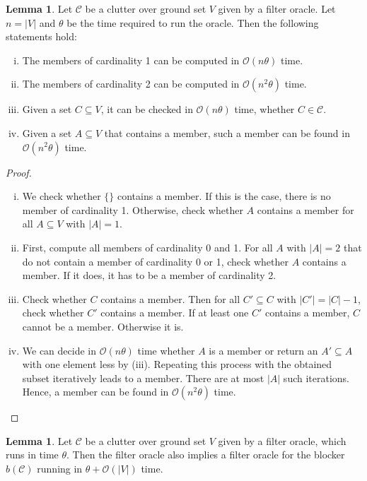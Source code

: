 \documentclass[a4paper, 12pt]{scrbook}
\theoremstyle{definition}
\newtheorem{lemma}[theorem]{Lemma}
\begin{document}
   \begin{lemma}\label{computations}
       Let $\mathcal{C}$ be a clutter over ground set $V$ given by a filter oracle.
       Let $n=|V|$ and $\theta$ be the time required to run the oracle.
       Then the following statements hold:
       \begin{enumerate}[(i)]
           \item The members of cardinality 1 can be computed in $\mathcal{O}(n\theta)$ time.
           \item The members of cardinality 2 can be computed in $\mathcal{O}(n^2\theta)$ time.
           \item Given a set $C \subseteq V$, it can be checked in $\mathcal{O}(n\theta)$ time, whether $C \in \mathcal{C}$.
           \item Given a set $A \subseteq V$ that contains a member, such a member can be found in $\mathcal{O}(n^2\theta)$ time.
       \end{enumerate}
   \end{lemma}
   \begin{proof}
       \leavevmode
       \begin{enumerate}[(i)]
           \item We check whether $\{\}$ contains a member. If this is the case, there is no member of cardinality 1. Otherwise, check whether $A$ contains a member for all $A \subseteq V$ with $|A|=1$.
           \item First, compute all members of cardinality 0 and 1. For all $A$ with $|A|=2$ that do not contain a member of cardinality 0 or 1, check whether $A$ contains a member. If it does, it has to be a member of cardinality 2.
           \item Check whether $C$ contains a member. Then for all $C' \subseteq C$ with $|C'|=|C|-1$, check whether $C'$ contains a member. If at least one $C'$ contains a member, $C$ cannot be a member. Otherwise it is.
           \item We can decide in $\mathcal{O}(n\theta)$ time whether $A$ is a member or return an $A' \subseteq A$ with one element less by (iii). Repeating this process with the obtained subset iteratively leads to a member. There are at most $|A|$ such iterations. Hence, a member can be found in $\mathcal{O}(n^2\theta)$ time.
       \end{enumerate}

   \end{proof}

   \begin{lemma}
       Let $\mathcal{C}$ be a clutter over ground set $V$ given by a filter oracle, which runs in time $\theta$.
       Then the filter oracle also implies a filter oracle for the blocker $b(\mathcal{C})$ running in $\theta+\mathcal{O}(|V|)$ time.
   \end{lemma}
\end{document}
